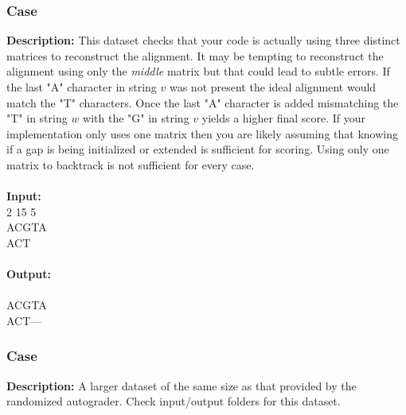 \documentclass{article}
\newcommand{\code}[1]{{\fontfamily{pcr}\selectfont #1}}
\begin{document}
\subsubsection*{Case }
\hline \vspace{5}
\textbf{Description:} This dataset checks that your code is actually using three distinct matrices to reconstruct the alignment. It may be tempting to reconstruct the alignment using only the \emph{middle} matrix but that could lead to subtle errors. If the last "A" character in string $v$ was not present the ideal alignment would match the "T" characters. Once the last "A" character is added mismatching the "T" in string $w$ with the "G" in string $v$ yields a higher final score. If your implementation only uses one matrix then you are likely assuming that knowing if a gap is being initialized or extended is sufficient for scoring. Using only one matrix to backtrack is not sufficient for every case.\\ \\
\noindent \textbf{Input:}\\
\code{5 2 15 5\\ACGTA\\ACT}\\ \\
\noindent \textbf{Output:}\\
\code{-12\\ACGTA\\ACT---}

\subsubsection*{Case }
\hline \vspace{5}
\textbf{Description:} A larger dataset of the same size as that provided by the randomized autograder. Check input/output folders for this dataset.\\ \\
\pagebreak
\end{document}

